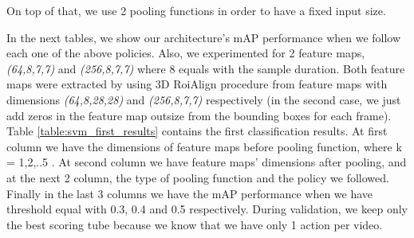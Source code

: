 \documentclass{report}
\begin{document}
On top of that, we use 2 pooling functions in order to have a fixed input size. \par
In the next tables, we show our architecture's  mAP performance when we follow each one of the above policies. Also,
we experimented for 2 feature maps, \textit{(64,8,7,7)} and \textit{(256,8,7,7)} where 8 equals with the sample duration.
Both feature maps were extracted by using 3D RoiAlign procedure from feature maps with dimensions \textit{(64,8,28,28)} and
\textit{(256,8,7,7)} respectively (in the second case, we just add zeros in the feature map outsize from the bounding boxes for
each frame). Table \ref{table:svm_first_results} contains the first classification results. At first column we have the dimensions
of feature maps before pooling function, where k = 1,2,..5 . At second column we have feature maps' dimensions after pooling, and at
the next 2 column, the type of pooling function and the policy we followed. Finally in the last 3 columns we have the mAP performance
when we have threshold equal with 0.3, 0.4 and 0.5 respectively. During validation, we keep only the best scoring tube because we know that
we have only 1 action per video.
\end{document}
